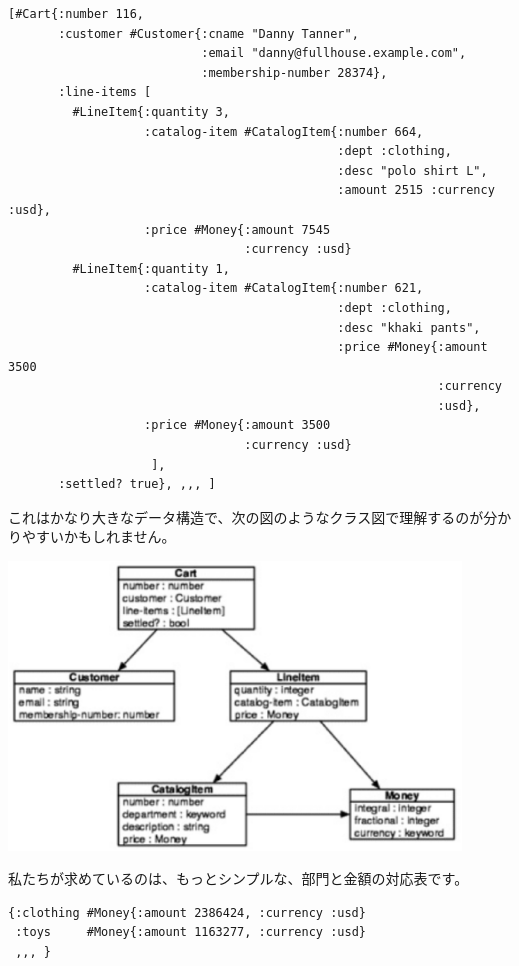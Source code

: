 \begin{lstlisting}[numbers=none]
[#Cart{:number 116,
       :customer #Customer{:cname "Danny Tanner",
                           :email "danny@fullhouse.example.com",
                           :membership-number 28374},
       :line-items [
         #LineItem{:quantity 3,
                   :catalog-item #CatalogItem{:number 664,
                                              :dept :clothing,
                                              :desc "polo shirt L",
                                              :amount 2515 :currency :usd},
                   :price #Money{:amount 7545
                                 :currency :usd}
         #LineItem{:quantity 1,
                   :catalog-item #CatalogItem{:number 621,
                                              :dept :clothing,
                                              :desc "khaki pants",
                                              :price #Money{:amount 3500
                                                            :currency
                                                            :usd},
                   :price #Money{:amount 3500
                                 :currency :usd}
                    ],
       :settled? true}, ,,, ]
\end{lstlisting}


これはかなり大きなデータ構造で、次の図のようなクラス図で理解するのが分かりやすいかもしれません。

\includegraphics[width=12cm]{fig_03_001.eps}

私たちが求めているのは、もっとシンプルな、部門と金額の対応表です。



\begin{lstlisting}[numbers=none]
{:clothing #Money{:amount 2386424, :currency :usd}
 :toys     #Money{:amount 1163277, :currency :usd}
 ,,, }
\end{lstlisting}

